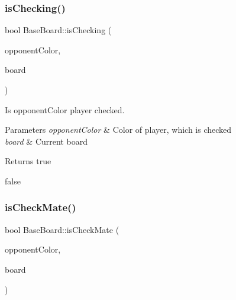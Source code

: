 \mbox{\label{class_base_board_a88d6e53bd8d8dd1f3ec3695fd6c29a81}} 
\subsubsection{\texorpdfstring{is\+Checking()}{isChecking()}}
{\footnotesize\ttfamily bool Base\+Board\+::is\+Checking (\begin{DoxyParamCaption}\item[{\hyperlink{_piece_8h_ad7595c48bb74c0dd2a7648712a2d4985}{Piece\+Color}}]{opponent\+Color,  }\item[{std\+::shared\+\_\+ptr$<$ \hyperlink{class_base_board}{Base\+Board} $>$}]{board }\end{DoxyParamCaption})}



Is opponent\+Color player checked. 


\begin{DoxyParams}{Parameters}
{\em opponent\+Color} & Color of player, which is checked \\
\hline
{\em board} & Current board \\
\hline
\end{DoxyParams}
\begin{DoxyReturn}{Returns}
true 

false 
\end{DoxyReturn}
\mbox{\label{class_base_board_af5c47782cec757ecb8f041925a0d7b7b}} 
\subsubsection{\texorpdfstring{is\+Check\+Mate()}{isCheckMate()}}
{\footnotesize\ttfamily bool Base\+Board\+::is\+Check\+Mate (\begin{DoxyParamCaption}\item[{\hyperlink{_piece_8h_ad7595c48bb74c0dd2a7648712a2d4985}{Piece\+Color}}]{opponent\+Color,  }\item[{std\+::shared\+\_\+ptr$<$ \hyperlink{class_base_board}{Base\+Board} $>$}]{board }\end{DoxyParamCaption})}



